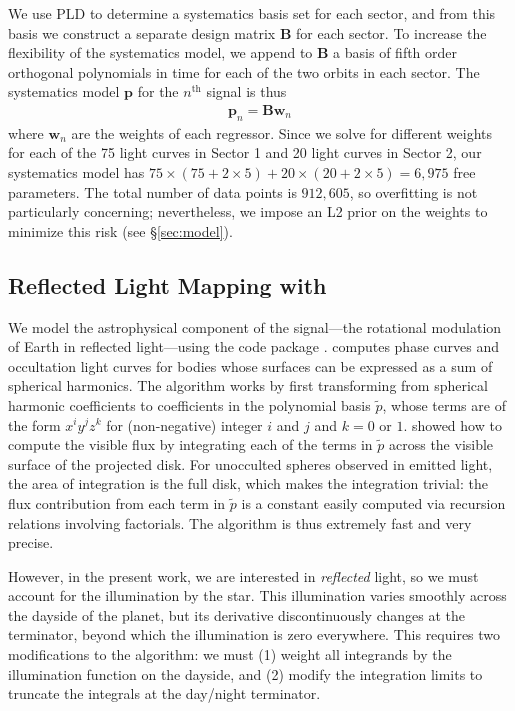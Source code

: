 \documentclass[modern]{aastex62}
\begin{document}
We use PLD to determine a systematics basis set for each \TESS sector, and
from this basis we construct a separate design matrix $\mathbf{B}$ for each sector. To
increase the flexibility of the systematics model, we append to $\mathbf{B}$ a basis of
fifth order orthogonal polynomials in time for each of the two orbits in each sector.
The systematics model $\mathbf{p}$ for the $n^\mathrm{th}$ signal is thus
%
\begin{align}
\mathbf{p}_n = \mathbf{B} \mathbf{w}_n
\end{align}
%
where $\mathbf{w}_n$ are the weights of each regressor.
Since we solve for different weights for each of the 75 light curves in Sector 1
and 20 light curves in Sector 2, our systematics model has
$75 \times (75 + 2 \times 5) + 20 \times (20 + 2 \times 5) = 6,975$ free parameters.
The total number of data points is $912,605$, so overfitting is not particularly
concerning; nevertheless, we impose an L2 prior on the weights to minimize this risk
(see \S\ref{sec:model}).

\subsection{Reflected Light Mapping with \starry}
\label{sec:starry}

We model the astrophysical component of the signal---the rotational modulation
of Earth in reflected light---using the \starry code package \citep{Luger2019}.
\starry computes phase curves and occultation light curves for bodies whose
surfaces can be expressed as a sum of spherical harmonics. 
The algorithm works by first transforming
from spherical harmonic coefficients to coefficients in the polynomial basis $\tilde{p}$, whose
terms are of the form $x^i y^j z^k$ for (non-negative) integer $i$ and $j$ 
and $k = 0$ or $1$. \citet{Luger2019} showed how to compute the visible
flux by integrating each of the terms in $\tilde{p}$ across the visible
surface of the projected disk. For unocculted spheres observed in emitted
light, the area of integration is the full disk, which makes the integration
trivial: the flux contribution from each term in $\tilde{p}$ is a constant
easily computed via recursion relations involving factorials. The algorithm is
thus extremely fast and very precise.

However, in the present work, we are interested in \emph{reflected} light, so we must
account for the illumination by the star. This illumination varies smoothly
across the dayside of the planet, but its derivative discontinuously changes at the 
terminator, beyond which the illumination is zero everywhere. This requires
two modifications to the \starry algorithm: we must (1) weight all integrands
by the illumination function on the dayside, and (2) modify the integration
limits to truncate the integrals at the day/night terminator.
\end{document}

